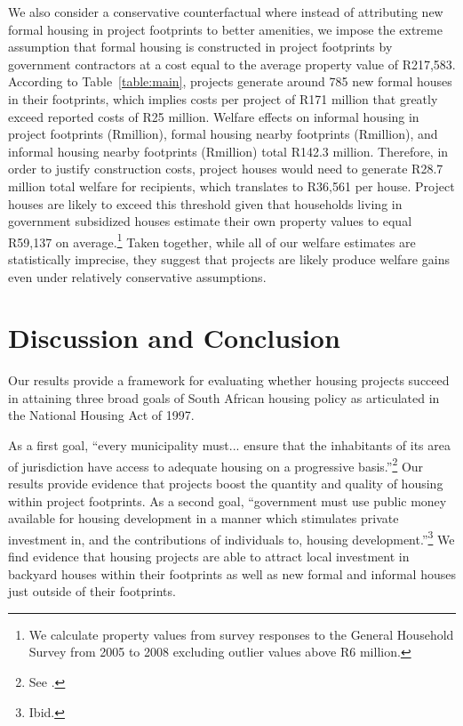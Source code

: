 \documentclass[12pt]{article}
\begin{document}
We also consider a conservative counterfactual where instead of attributing new formal housing in project footprints to better amenities, we impose the extreme assumption that formal housing is constructed in project footprints by government contractors at a cost equal to the average property value of R217,583.  According to Table~\ref{table:main}, projects generate around 785 new formal houses in their footprints, which implies costs per project of R171 million that greatly exceed reported costs of R25 million.  Welfare effects on informal housing in project footprints (Rmillion), formal housing nearby footprints (Rmillion), and informal housing nearby footprints (Rmillion) total R142.3 million.  Therefore, in order to justify construction costs, project houses would need to generate R28.7 million total welfare for recipients, which translates to R36,561 per house.  Project houses are likely to exceed this threshold given that households living in government subsidized houses estimate their own property values to equal R59,137 on average.\footnote{We calculate property values from survey responses to the General Household Survey from 2005 to 2008 excluding outlier values above R6 million.}   Taken together, while all of our welfare estimates are statistically imprecise, they suggest that projects are likely produce welfare gains even under relatively conservative assumptions.


\section{Discussion and Conclusion}\label{section:discussion}


Our results provide a framework for evaluating whether housing projects succeed in attaining three broad goals of South African housing policy as articulated in the National Housing Act of 1997.

As a first goal, ``every municipality must... ensure that the inhabitants of its area of jurisdiction have access to adequate housing on a progressive basis.''\footnote{See \cite{housingact}.}  Our results provide evidence that projects boost the quantity and quality of housing within project footprints.  As a second goal, ``government must use public money available for housing development in a manner which stimulates private investment in, and the contributions of individuals to, housing development.''\footnote{Ibid.}    We find evidence that housing projects are able to attract local investment in backyard houses within their footprints as well as new formal and informal houses just outside of their footprints.  
\end{document}
